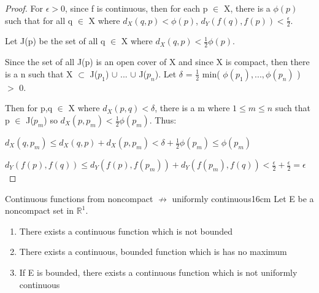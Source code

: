     \begin{proof}
        For $\epsilon > 0$, since f is continuous, then for each
        p $\in$ X, there is a $\phi(p)$ such that for all q $\in$ X
        where $d_X(q,p) < \phi(p)$, $d_Y(f(q),f(p)) < \frac{\epsilon}{2}$.

        Let J(p) be the set of all q $\in$ X where
        $d_X(q,p) < \frac{1}{2}\phi(p)$.

        Since the set of all J(p) is an open cover of X and since X is compact,
        then there is a n such that X $\subset$ J($p_1$) $\cup$ ... $\cup$ J($p_n$).
        Let $\delta$ = $\frac{1}{2}$ min( $\phi(p_1), ... , \phi(p_n)$ ) $>$ 0.

        Then for p,q $\in$ X where $d_X(p,q) < \delta$, there is a m where
        $1 \leq m \leq n$ such that p $\in$ J($p_m$) so
        $d_X(p,p_m) < \frac{1}{2} \phi(p_m)$. Thus:

        \hspace{1cm}
        $d_X(q,p_m) \leq d_X(q,p) + d_X(p,p_m) < \delta + \frac{1}{2} \phi(p_m)
        \leq \phi(p_m)$

        \hspace{1cm}
        $d_Y(f(p),f(q)) \leq d_Y(f(p),f(p_m)) + d_Y(f(p_m),f(q))
        < \frac{\epsilon}{2} + \frac{\epsilon}{2} = \epsilon$
    \end{proof}

    \vspace{0.5cm}



    \begin{wtheorem}{Continuous functions from noncompact
    $\not \rightarrow$ uniformly continuous}{16cm}
        Let E be a noncompact set in $\mathbb{R}^1$.

        \begin{enumerate}[label=(\alph*), leftmargin=1cm, itemsep=0.1cm]
            \item There exists a continuous function which is not bounded
            
            \item There exists a continuous, bounded function which is
            has no maximum
            
            \item If E is bounded, there exists a continuous function which
            is not uniformly continuous
        \end{enumerate}
    \end{wtheorem}
    
